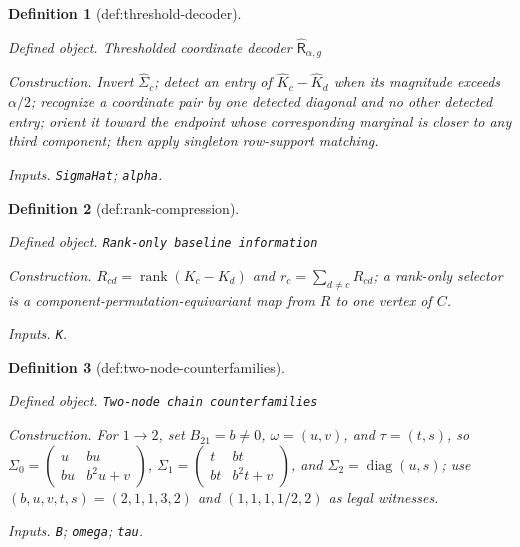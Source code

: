 \documentclass{article}
\newtheorem{definition}{Definition}
\begin{document}
\begin{definition}[def:threshold-decoder]\label{def:threshold-decoder}
\par\smallskip\noindent\emph{Defined object.} Thresholded coordinate decoder \(\widehat{\mathsf R}_{\alpha,g}\)
\par\smallskip\noindent\emph{Construction.} Invert \(\widehat\Sigma_c\); detect an entry of \(\widehat K_c-\widehat K_d\) when its magnitude exceeds \(\alpha/2\); recognize a coordinate pair by one detected diagonal and no other detected entry; orient it toward the endpoint whose corresponding marginal is closer to any third component; then apply singleton row-support matching.
\par\smallskip\noindent\emph{Inputs.} \texttt{SigmaHat}; \texttt{alpha}.
\end{definition}

\begin{definition}[def:rank-compression]\label{def:rank-compression}
\par\smallskip\noindent\emph{Defined object.} \texttt{Rank-\allowbreak{}only baseline information}
\par\smallskip\noindent\emph{Construction.} \(R_{cd}=\operatorname{rank}(K_c-K_d)\) and \(r_c=\sum_{d\neq c}R_{cd}\); a rank-only selector is a component-permutation-equivariant map from \(R\) to one vertex of \(C\).
\par\smallskip\noindent\emph{Inputs.} \texttt{K}.
\end{definition}

\begin{definition}[def:two-node-counterfamilies]\label{def:two-node-counterfamilies}
\par\smallskip\noindent\emph{Defined object.} \texttt{Two-\allowbreak{}node chain counterfamilies}
\par\smallskip\noindent\emph{Construction.} For \(1\to2\), set \(B_{21}=b\neq0\), \(\omega=(u,v)\), and \(\tau=(t,s)\), so \(\Sigma_0=\begin{pmatrix}u&bu\\bu&b^2u+v\end{pmatrix}\), \(\Sigma_1=\begin{pmatrix}t&bt\\bt&b^2t+v\end{pmatrix}\), and \(\Sigma_2=\operatorname{diag}(u,s)\); use \((b,u,v,t,s)=(2,1,1,3,2)\) and \((1,1,1,1/2,2)\) as legal witnesses.
\par\smallskip\noindent\emph{Inputs.} \texttt{B}; \texttt{omega}; \texttt{tau}.
\end{definition}
\end{document}
